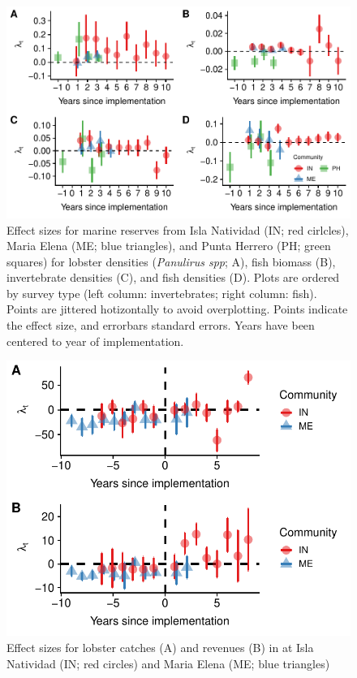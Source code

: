\documentclass{frontiersSCNS}
\theoremstyle{definition}
\theoremstyle{definition}
\theoremstyle{definition}
\theoremstyle{remark}
\begin{document}
\begin{figure}
\centering
\includegraphics{Villasenor-Derbez_files/figure-latex/unnamed-chunk-4-1.pdf}
\caption{\label{fig:unnamed-chunk-4}\label{fig:indicators}Effect sizes for
marine reserves from Isla Natividad (IN; red cirlcles), Maria Elena (ME;
blue triangles), and Punta Herrero (PH; green squares) for lobster
densities (\emph{Panulirus spp}; A), fish biomass (B), invertebrate
densities (C), and fish densities (D). Plots are ordered by survey type
(left column: invertebrates; right column: fish). Points are jittered
hotizontally to avoid overplotting. Points indicate the effect size, and
errorbars standard errors. Years have been centered to year of
implementation.}
\end{figure}

\begin{figure}
\centering
\includegraphics{Villasenor-Derbez_files/figure-latex/unnamed-chunk-6-1.pdf}
\caption{\label{fig:unnamed-chunk-6}\label{fig:lobsters}Effect sizes for
lobster catches (A) and revenues (B) in at Isla Natividad (IN; red
circles) and Maria Elena (ME; blue triangles)}
\end{figure}
\end{document}
